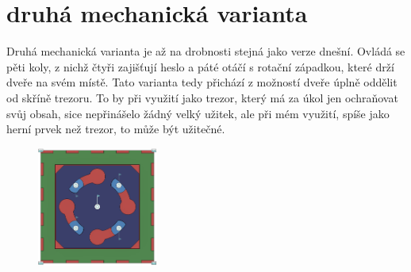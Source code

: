 \section*{druhá mechanická varianta}

Druhá mechanická varianta je až na drobnosti stejná jako verze dnešní.
Ovládá se pěti koly, z nichž čtyři zajišťují heslo a páté otáčí s rotační západkou, které drží dveře na svém místě.
Tato varianta tedy přichází z možností dveře úplně oddělit od skříně trezoru. To by při využití jako trezor, který
má za úkol jen ochraňovat svůj obsah, sice nepřinášelo žádný velký užitek, ale při mém využití, spíše jako herní 
prvek než trezor, to může být užitečné.

\begin{figure}[htbp]
    \centering
    \includegraphics[width=150]{kapitoly/obrazky/M2-mechanizmus.png}

\end{figure}

